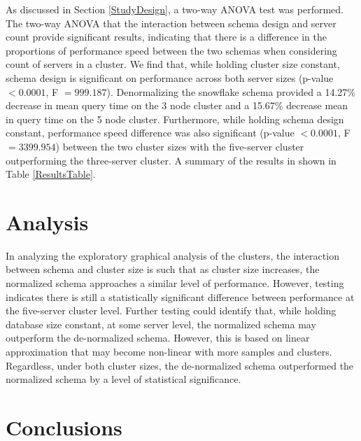 \documentclass[journal]{IEEEtran}
\begin{document}
As discussed in Section \ref{StudyDesign}, a two-way ANOVA test was performed.
The two-way ANOVA that the interaction between schema design and server count provide significant results,
indicating that there is a difference in the proportions of performance speed between the two schemas when considering count of servers in a cluster.
We find that, while holding cluster size constant,
 schema design is significant on performance across both server sizes
 (p-value $< 0.0001$, F $ = 999.187$). 
Denormalizing the snowflake schema provided a 14.27\% decrease in mean query time on
 the 3 node cluster and a 15.67\% decrease mean in query time on the 5 node cluster.
Furthermore, while holding schema design constant, 
 performance speed difference was also significant 
 (p-value $< 0.0001$, F $= 3399.954$) 
 between the two cluster sizes with the five-server cluster outperforming
 the three-server cluster. 
A summary of the results in shown in Table \ref{ResultsTable}.


\section{Analysis}

In analyzing the exploratory graphical analysis of the clusters, 
 the interaction between schema and cluster size is such that as cluster size increases,
 the normalized schema approaches a similar level of performance. 
However, testing indicates there is still a statistically significant difference between 
 performance at the five-server cluster level. 
Further testing could identify that, while holding database size constant, at some server level, 
 the normalized schema may outperform the de-normalized schema. 
However, this is based on linear approximation that may become non-linear with more samples and clusters. 
Regardless, under both cluster sizes,
 the de-normalized schema outperformed the normalized schema by a level of statistical significance.

\section{Conclusions}
\end{document}
